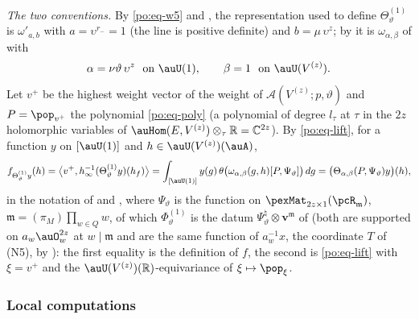 \documentclass[10pt]{amsart}
\theoremstyle{definition}
\theoremstyle{remark}
\newcommand{\C}{\mathbb C}
\newcommand{\R}{\mathbb R}
\providecommand{\psvac}{\mathbf v}
\begin{document}
\emph{The two conventions.} By \eqref{po:eq-w5} and {\cite[Remark~2.17]{P53}}, the representation
used to define $\Theta^{(1)}_\vartheta$ is $\omega'_{a,b}$ with $a=\upsilon^{r_-}=1$ (the line is
positive definite) and $b=\mu\,\upsilon^{z}$; by {\cite[(13)]{P53}} it is $\omega_{\alpha,\beta}$ of
{\cite[\S2.3]{P53}} with
\[
\alpha=\nu\vartheta\,\upsilon^{z}\ \text{ on }\auU(1),\qquad\beta=1\ \text{ on }\auU(V^{(z)}).
\]
Let $v^+$ be the highest weight vector of the weight of $\mathcal A(V^{(z)};p,\vartheta)$ and
$P=\pop_{v^+}$ the polynomial \eqref{po:eq-poly} (a polynomial of degree $l_\tau$ at $\tau$ in the
$2z$ holomorphic variables of $\auHom(E,V^{(z)})\otimes_\tau\R=\C^{2z}$). By \eqref{po:eq-lift}, for
a function $y$ on $[\auU(1)]$ and $h\in\auU(V^{(z)})(\auA)$,
\begin{equation}\label{pex:eq-f}
f_{\Theta^{(1)}_\vartheta y}(h)=\bigl\langle v^+,h_\infty^{-1}(\Theta^{(1)}_\vartheta y)(h_f)\bigr\rangle
=\int_{[\auU(1)]}y(g)\,\theta\bigl(\omega_{\alpha,\beta}(g,h)[P,\Psi_\vartheta]\bigr)\,dg
=\bigl(\Theta_{\alpha,\beta}(P,\Psi_\vartheta)y\bigr)(h),
\end{equation}
in the notation of {\cite[Lemma~2.18]{P53}} and {\cite[\S2.3]{P53}}, where $\Psi_\vartheta$ is the
function on $\pexMat_{2z\times1}(\pcR_{\mathfrak m})$, $\mathfrak m=(\pi_M)\prod_{w\in Q}w$, of which
$\Phi^{(1)}_\vartheta$ is the datum $\Psi^\natural_\vartheta\otimes\psvac^{\mathfrak m}$ of
{\cite[Definition~6.31]{P53}} (both are supported on $a_w\auO_w^{2z}$ at $w\mid\mathfrak m$ and are the same
function of $a_w^{-1}x$, the coordinate $T$ of (N5), by {\cite[Lemma~6.32(c)]{P53}}): the first
equality is the definition of $f$, the second is \eqref{po:eq-lift} with $\xi=v^+$ and the
$\auU(V^{(z)})(\R)$-equivariance of $\xi\mapsto\pop_\xi$.

\subsubsection{Local computations}\label{pex:ss-local}
\end{document}
